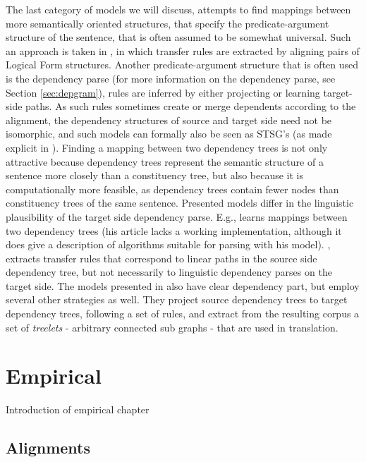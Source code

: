 \documentclass{report}
\theoremstyle{definition}
\theoremstyle{plain}
\begin{document}
The last category of models we will discuss, attempts to find mappings between more semantically oriented structures, that specify the predicate-argument structure of the sentence, that is often assumed to be somewhat universal. Such an approach is taken in \cite{menezes2003best}, in which transfer rules are extracted by aligning pairs of Logical Form structures. Another predicate-argument structure that is often used is the dependency parse (for more information on the dependency parse, see Section \ref{sec:depgram}), rules are inferred by either projecting or learning target-side paths. As such rules sometimes create or merge dependents according to the alignment, the dependency structures of source and target side need not be isomorphic, and such models can formally also be seen as STSG's (as made explicit in \cite{eisner2003learning}). Finding a mapping between two dependency trees is not only attractive because dependency trees represent the semantic structure of a sentence more closely than a constituency tree, but also because it is computationally more feasible, as dependency trees contain fewer nodes than constituency trees of the same sentence. Presented models differ in the linguistic plausibility of the target side dependency parse. E.g., \cite{eisner2003learning} learns mappings between two dependency trees (his article lacks a working implementation, although it does give a description of algorithms suitable for parsing with his model). \cite{lin2004path}, extracts transfer rules that correspond to linear paths in the source side dependency tree, but not necessarily to linguistic dependency parses on the target side. The models presented in \cite{quirk2005dependency,quirk2006dependency,quirk2006we} also have clear dependency part, but employ several other strategies as well. They project source dependency trees to target dependency trees, following a set of rules, and extract from the resulting corpus a set of \textit{treelets} - arbitrary connected sub graphs - that are used in translation.

 
\chapter{Empirical}\label{ch:empirical} 
 
Introduction of empirical chapter 
 
 
\section{Alignments}
\label{sec:alignments}
\end{document}
